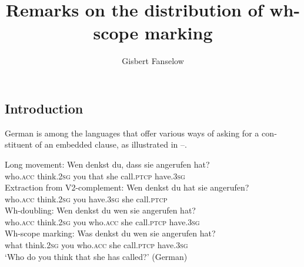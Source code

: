 \documentclass[output=paper,colorlinks,citecolor=brown]{langscibook}
\author{Gisbert Fanselow\affiliation{University of Potsdam}\orcid{}}
\title{Remarks on the distribution of wh-scope marking}
\begin{document}
\begin{otherlanguage}{english}
\maketitle


\section{Introduction}

German is among the languages that offer various ways of asking for a constituent of an embedded clause, as illustrated in --.

\ea\label{ex:fanselow:1}
\ea     Long movement: \newline
\gll  Wen denkst du, dass sie angerufen hat?  \\ 
     who.\textsc{acc} think.\textsc{2sg} you that she call.\textsc{ptcp} have.\textsc{3sg} \\  
\label{ex:fanselow:1a}
\ex Extraction from V2-complement: \newline
\gll  Wen denkst du hat sie angerufen? \\
    who.\textsc{acc} think.\textsc{2sg} you have.\textsc{3sg} she call.\textsc{ptcp} \\   
\label{ex:fanselow:1b}
\ex Wh-doubling: \newline
\gll  Wen denkst du wen sie angerufen hat? \\
    who.\textsc{acc} think.\textsc{2sg} you who.\textsc{acc} she call.\textsc{ptcp} have.\textsc{3sg}   \\   
\label{ex:fanselow:1c}
\ex Wh-scope marking: \newline
\gll  Was denkst du wen sie angerufen hat? \\
    what think.\textsc{2sg} you who.\textsc{acc} she call.\textsc{ptcp} have.\textsc{3sg}   \\  \label{ex:fanselow:1d}
\z
\glt ‘Who do you think that she has called?' \hfill (German)
\z


\end{otherlanguage}
\end{document}
